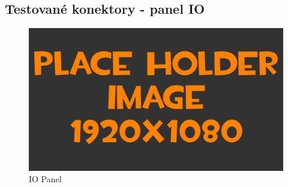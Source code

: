 \newpage
\subsection{Testované konektory - panel IO}
\begin{figure}[h!]
	\centering
	\includegraphics[width=\textwidth]{pictures/placeHolderFHD.png}
    	\caption{IO Panel}
   	\label{fig:panelIO}
\end{figure}
